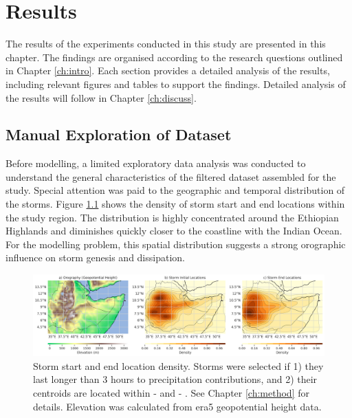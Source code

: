 \chapter{Results}
\label{ch:results}

The results of the experiments conducted in this study are presented in this chapter. The findings are organised according to the research questions outlined in Chapter \ref{ch:intro}. Each section provides a detailed analysis of the results, including relevant figures and tables to support the findings. Detailed analysis of the results will follow in Chapter \ref{ch:discuss}.

\section{Manual Exploration of Dataset}

Before modelling, a limited exploratory data analysis was conducted to understand the general characteristics of the filtered dataset assembled for the study. Special attention was paid to the geographic and temporal distribution of the storms. Figure \ref{fig:orography_storm_init_end_kde} shows the density of storm start and end locations within the study region. The distribution is highly concentrated around the Ethiopian Highlands and diminishes quickly closer to the coastline with the Indian Ocean. For the modelling problem, this spatial distribution suggests a strong orographic influence on storm genesis and dissipation.

\begin{figure}[ht]
    \centering
    \includegraphics[width=\textwidth]{../figures/generated/exploration/orography_storm_init_end_kde.png}
    \caption{Storm start and end location density. Storms were selected if 1) they last longer than 3 hours to precipitation contributions, and 2) their centroids are located within  -  and  -  \citep{Hill2023}. See Chapter \ref{ch:method} for details. Elevation was calculated from \acrshort{era5} geopotential height data.}
    \label{fig:orography_storm_init_end_kde}
\end{figure}

